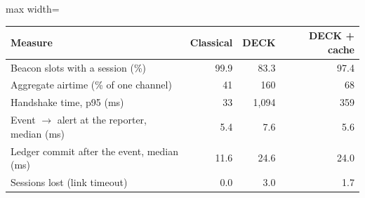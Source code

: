 \begin{adjustbox}{max width=\linewidth}
\begin{tabular}{lrrr}
\toprule
Measure & Classical & DECK & DECK + cache \\
\midrule
Beacon slots with a session (\%) & 99.9 & 83.3 & 97.4 \\
Aggregate airtime (\% of one channel) & 41 & 160 & 68 \\
Handshake time, p95 (ms) & 33 & 1{,}094 & 359 \\
Event $\rightarrow$ alert at the reporter, median (ms) & 5.4 & 7.6 & 5.6 \\
Ledger commit after the event, median (ms) & 11.6 & 24.6 & 24.0 \\
Sessions lost (link timeout) & 0.0 & 3.0 & 1.7 \\
\bottomrule
\end{tabular}
\end{adjustbox}
\par{}
